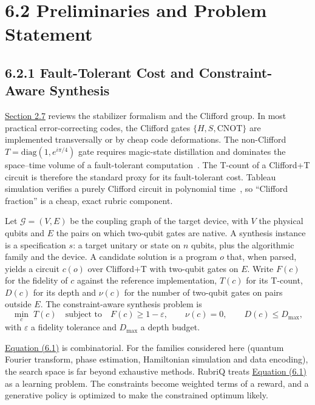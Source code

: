 \documentclass{report}
\theoremstyle{plain}
\theoremstyle{definition}
\theoremstyle{remark}
\newcommand{\eps}{\varepsilon}
\begin{document}
\section{6.2 Preliminaries and Problem Statement}\label{sec:syn:prelim}

\subsection{6.2.1 Fault-Tolerant Cost and Constraint-Aware Synthesis}\label{sec:syn:ftcost}

\hyperref[sec:bg:qec]{Section 2.7} reviews the stabilizer formalism and the Clifford group. In most practical error-correcting codes, the Clifford gates $\{H, S, \mathrm{CNOT}\}$ are implemented transversally or by cheap code deformations. The non-Clifford $T=\mathrm{diag}(1,e^{i\pi/4})$ gate requires magic-state distillation and dominates the space--time volume of a fault-tolerant computation~\cite{bravyi2005magic,fowler2012surfacecodes}. The T-count of a Clifford+T circuit is therefore the standard proxy for its fault-tolerant cost. Tableau simulation verifies a purely Clifford circuit in polynomial time~\cite{gottesman1997stabilizer,aaronson2004stabilizer}, so ``Clifford fraction'' is a cheap, exact rubric component.

Let $\mathcal{G}=(V,E)$ be the coupling graph of the target device, with $V$ the physical qubits and $E$ the pairs on which two-qubit gates are native. A synthesis instance is a specification $s$: a target unitary or state on $n$ qubits, plus the algorithmic family and the device. A candidate solution is a program $o$ that, when parsed, yields a circuit $c(o)$ over Clifford+T with two-qubit gates on $E$. Write $F(c)$ for the fidelity of $c$ against the reference implementation, $T(c)$ for its T-count, $D(c)$ for its depth and $\nu(c)$ for the number of two-qubit gates on pairs outside $E$. The constraint-aware synthesis problem is
\hypertarget{eq:syn:problem}{}\[
  \min_{c}\; T(c) \quad\text{subject to}\quad F(c)\ge 1-\eps,\qquad \nu(c)=0,\qquad D(c)\le D_{\max},
\tag{6.1}\]
with $\eps$ a fidelity tolerance and $D_{\max}$ a depth budget.

\hyperref[eq:syn:problem]{Equation (6.1)} is combinatorial. For the families considered here (quantum Fourier transform, phase estimation, Hamiltonian simulation and data encoding), the search space is far beyond exhaustive methods. RubriQ treats \hyperref[eq:syn:problem]{Equation (6.1)} as a learning problem. The constraints become weighted terms of a reward, and a generative policy is optimized to make the constrained optimum likely.
\end{document}
